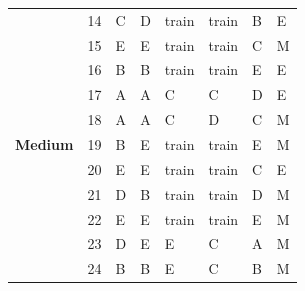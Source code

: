 \documentclass[pageno]{final_paper}
\begin{document}
\begin{table}[]
\begin{tabularx}{\textwidth}{lXXXXXXX}
\textbf{}                & 14              & C                       & D                      & train                   & train                   & B                       & E                   \\
\textbf{}                & 15              & E                       & E                      & train                   & train                   & C                       & M                   \\
\textbf{}                & 16              & B                       & B                      & train                   & train                   & E                       & E                   \\
\textbf{}                & 17              & A                       & A                      & C                       & C                       & D                       & E                   \\
\textbf{}                & 18              & A                       & A                      & C                       & D                       & C                       & M                   \\
\textbf{Medium}          & 19              & B                       & E                      & train                   & train                   & E                       & M                   \\
\textbf{}                & 20              & E                       & E                      & train                   & train                   & C                       & E                   \\
\textbf{}                & 21              & D                       & B                      & train                   & train                   & D                       & M                   \\
\textbf{}                & 22              & E                       & E                      & train                   & train                   & E                       & M                   \\
\textbf{}                & 23              & D                       & E                      & E                       & C                       & A                       & M                   \\
\textbf{}                & 24              & B                       & B                      & E                       & C                       & B                       & M                   \\ \midrule

\end{tabularx}
\end{table}
\end{document}
